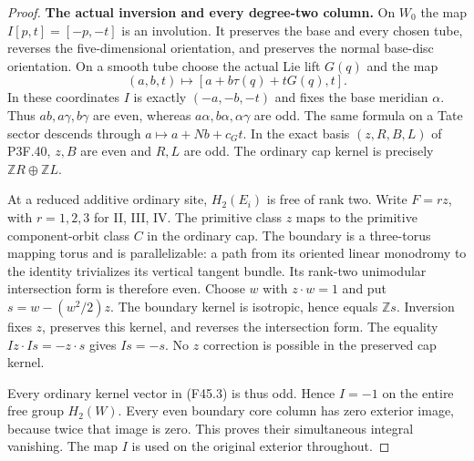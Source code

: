 \begin{proof}
\par\medskip\noindent\textbf{The actual inversion and every degree-two column.}\enspace
On $W_0$ the map $I[p,t]=[-p,-t]$ is an involution. It preserves
the base and every chosen tube, reverses the five-dimensional
orientation, and preserves the normal base-disc orientation.
On a smooth tube choose the actual Lie lift $G(q)$ and the map
\[
 (a,b,t)\longmapsto[a+b\tau(q)+tG(q),t].
\]
In these coordinates $I$ is exactly $(-a,-b,-t)$ and fixes the
base meridian $\alpha$. Thus $ab,a\gamma,b\gamma$ are even,
whereas $a\alpha,b\alpha,\alpha\gamma$ are odd.
The same formula on a Tate sector descends through
$a\mapsto a+Nb+c_Gt$. In the exact basis $(z,R,B,L)$ of
P3F.40, $z,B$ are even and $R,L$ are odd. The ordinary cap kernel
is precisely $\mathbb ZR\oplus\mathbb ZL$.

At a reduced additive ordinary site, $H_2(E_i)$ is free of
rank two. Write $F=r z$, with $r=1,2,3$ for II, III, IV.
The primitive class $z$ maps to the primitive component-orbit
class $C$ in the ordinary cap. The boundary is a three-torus
mapping torus and is parallelizable: a path from its oriented
linear monodromy to the identity trivializes its vertical
tangent bundle. Its rank-two unimodular intersection form is
therefore even. Choose $w$ with $z\cdot w=1$ and put
$s=w-(w^2/2)z$. The boundary kernel is isotropic, hence equals
$\mathbb Zs$. Inversion fixes $z$, preserves this kernel, and
reverses the intersection form. The equality
$Iz\cdot Is=-z\cdot s$ gives $Is=-s$. No $z$ correction is
possible in the preserved cap kernel.

Every ordinary kernel vector in (F45.3) is thus odd. Hence
$I=-1$ on the entire free group $H_2(W)$. Every even boundary
core column has zero exterior image, because twice that image
is zero. This proves their simultaneous integral vanishing.
The map $I$ is used on the original exterior throughout.


\end{proof}
